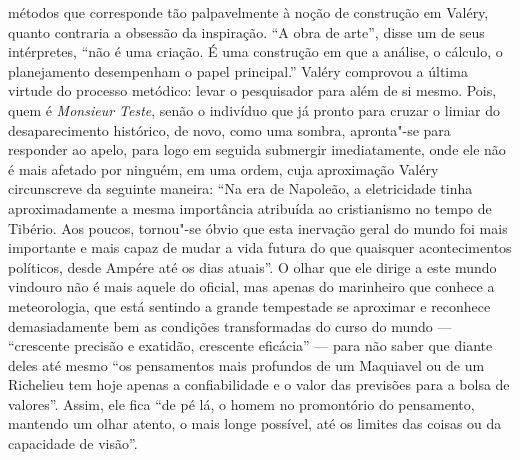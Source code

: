 métodos que corresponde tão palpavelmente à noção de construção em
Valéry, quanto contraria a obsessão da inspiração. ``A obra de arte'',
disse um de seus intérpretes, ``não é uma criação. É uma construção em
que a análise, o cálculo, o planejamento desempenham o papel principal.''
Valéry comprovou a última virtude do processo metódico: levar o
pesquisador para além de si mesmo. Pois, quem é \emph{Monsieur Teste}, senão o
indivíduo que já pronto para cruzar o limiar do desaparecimento
histórico, de novo, como uma sombra, apronta"-se para responder ao apelo,
para logo em seguida submergir imediatamente, onde ele não é mais
afetado por ninguém, em uma ordem, cuja aproximação Valéry circunscreve
da seguinte maneira: ``Na era de Napoleão, a eletricidade tinha
aproximadamente a mesma importância atribuída ao cristianismo no tempo
de Tibério. Aos poucos, tornou"-se óbvio que esta inervação geral do
mundo foi mais importante e mais capaz de mudar a vida futura do que
quaisquer acontecimentos políticos, desde Ampére até os dias atuais''. O olhar que
ele dirige a este mundo vindouro não é mais aquele do oficial, mas
apenas do marinheiro que conhece a meteorologia, que está sentindo a
grande tempestade se aproximar e reconhece demasiadamente bem as condições
transformadas do curso do mundo --- ``crescente precisão e exatidão,
crescente eficácia'' --- para não saber que diante deles até mesmo ``os
pensamentos mais profundos de um Maquiavel ou de um Richelieu tem hoje apenas
a confiabilidade e o valor das previsões para a bolsa de valores''. Assim,
ele fica ``de pé lá, o homem no promontório do pensamento, mantendo um
olhar atento, o mais longe possível, até os limites das coisas ou da
capacidade de visão''.

